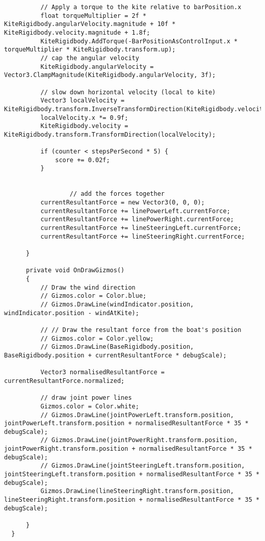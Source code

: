 \begin{lstlisting}
          // Apply a torque to the kite relative to barPosition.x
          float torqueMultiplier = 2f * KiteRigidbody.angularVelocity.magnitude + 10f * KiteRigidbody.velocity.magnitude + 1.8f;
          KiteRigidbody.AddTorque(-BarPositionAsControlInput.x * torqueMultiplier * KiteRigidbody.transform.up);
          // cap the angular velocity
          KiteRigidbody.angularVelocity = Vector3.ClampMagnitude(KiteRigidbody.angularVelocity, 3f);
  
          // slow down horizontal velocity (local to kite)
          Vector3 localVelocity = KiteRigidbody.transform.InverseTransformDirection(KiteRigidbody.velocity);
          localVelocity.x *= 0.9f;
          KiteRigidbody.velocity = KiteRigidbody.transform.TransformDirection(localVelocity);
  
          if (counter < stepsPerSecond * 5) {
              score += 0.02f;
          }
  
          
                  // add the forces together
          currentResultantForce = new Vector3(0, 0, 0);
          currentResultantForce += linePowerLeft.currentForce;
          currentResultantForce += linePowerRight.currentForce;
          currentResultantForce += lineSteeringLeft.currentForce;
          currentResultantForce += lineSteeringRight.currentForce;
  
      }
  
      private void OnDrawGizmos()
      {
          // Draw the wind direction
          // Gizmos.color = Color.blue;
          // Gizmos.DrawLine(windIndicator.position, windIndicator.position - windAtKite);
  
          // // Draw the resultant force from the boat's position
          // Gizmos.color = Color.yellow;
          // Gizmos.DrawLine(BaseRigidbody.position, BaseRigidbody.position + currentResultantForce * debugScale);
  
          Vector3 normalisedResultantForce = currentResultantForce.normalized;
  
          // draw joint power lines
          Gizmos.color = Color.white;
          // Gizmos.DrawLine(jointPowerLeft.transform.position, jointPowerLeft.transform.position + normalisedResultantForce * 35 * debugScale); 
          // Gizmos.DrawLine(jointPowerRight.transform.position, jointPowerRight.transform.position + normalisedResultantForce * 35 * debugScale);
          // Gizmos.DrawLine(jointSteeringLeft.transform.position, jointSteeringLeft.transform.position + normalisedResultantForce * 35 * debugScale);
          Gizmos.DrawLine(lineSteeringRight.transform.position, lineSteeringRight.transform.position + normalisedResultantForce * 35 * debugScale);
  
      }
  }
\end{lstlisting}  


